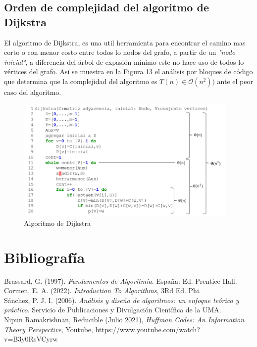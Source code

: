 \documentclass[12pt,twoside]{article}
\begin{document}
    \subsection{Orden de complejidad del algoritmo de Dijkstra}
        El algoritmo de Dijkstra, es una util herramienta para encontrar el camino mas corto o con menor costo entre todos lo nodos del grafo, a partir de un {\it "nodo inicial"}, a diferencia del \'arbol de expasi\'on m\'inimo este no hace uso de todos lo v\'ertices del grafo. As\'i se muestra en la Figura 13 el an\'alisis por bloques de c\'odigo que determina que la complejidad del algoritmo es $T(n)\in\mathcal{O}(n^2))$ ante el peor caso del algoritmo.
        \begin{figure}[H]
        \centering
        \includegraphics[height=6cm]{imagenes/complejidad_dijkstra.png}
        \caption{Algoritmo de Dijkstra}
        
    \end{figure}
    \section{Bibliograf\'ia}
    Brassard, G. (1997). \textit {Fundamentos de Algoritmia}. España: Ed. Prentice Hall.\\[0.4cm]
    Cormen, E. A. (2022). \textit{Introduction To Algorithms}, 3Rd Ed. Phi.\\[0.4cm]
    S\'anchez, P. J. I. (2006). \textit{Análisis y diseño de algoritmos: un enfoque teórico y práctico}. Servicio de Publicaciones y Divulgación Científica de la UMA.\\[0.4cm]
    Nipun Ramakrishnan, Reducible (Julio 2021), \textit{Huffman Codes: An Information Theory Perspective}, Youtube, https://www.youtube.com/watch?v=B3y0RsVCyrw
\end{document}
